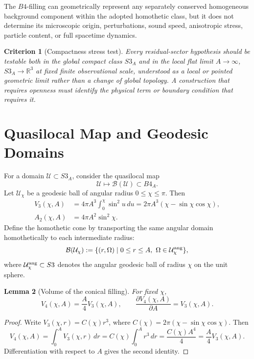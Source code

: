 \documentclass[11pt,a4paper]{article}
\def\Bfour{B4}%
\def\Sthree{S3}%
\def\dd{d}%
\numberwithin{equation}{section}
\newtheorem{criterion}{Criterion}
\newtheorem{lemma}[criterion]{Lemma}
\theoremstyle{remark}
\newcommand{\Sthree}{S^3}
\newcommand{\Bfour}{B^4}
\newcommand{\Dom}{\mathcal{U}}
\newcommand{\B}{\mathcal{B}}
\newcommand{\dd}{\mathrm{d}}
\begin{document}
The \(\Bfour\)-filling can geometrically represent any separately conserved homogeneous background component within the adopted homothetic class, but it does not determine its microscopic origin, perturbations, sound speed, anisotropic stress, particle content, or full spacetime dynamics.

\begin{criterion}[Compactness stress test]
Every residual-sector hypothesis should be testable both in the global compact class \(\Sthree_A\) and in the local flat limit \(A\to\infty\), \(\Sthree_A\to\mathbb{R}^3\) at fixed finite observational scale, understood as a local or pointed geometric limit rather than a change of global topology. A construction that requires openness must identify the physical term or boundary condition that requires it.
\end{criterion}

\section{Quasilocal Map and Geodesic Domains}
For a domain \(\Dom\subset \Sthree_A\), consider the quasilocal map
\begin{equation}
\Dom\longmapsto \B(\Dom)\subset \Bfour_A.
\end{equation}
Let \(\Dom_\chi\) be a geodesic ball of angular radius \(0\le \chi\le\pi\). Then
\begin{align}
V_3(\chi,A)&=4\pi A^3\int_0^\chi \sin^2u\,\dd u
=2\pi A^3(\chi-\sin\chi\cos\chi),\\
A_2(\chi,A)&=4\pi A^2\sin^2\chi.
\end{align}
Define the homothetic cone by transporting the same angular domain homothetically to each intermediate radius:
\begin{equation}
\B(\Dom_\chi):=\{(r,\Omega)\mid 0\le r\le A,\ \Omega\in \Dom_\chi^{\rm ang}\},
\end{equation}
where \(\Dom_\chi^{\rm ang}\subset \Sthree\) denotes the angular geodesic ball of radius \(\chi\) on the unit sphere.

\begin{lemma}[Volume of the conical filling]
For fixed \(\chi\),
\begin{equation}
V_4(\chi,A)=\frac{A}{4}V_3(\chi,A),
\qquad
\frac{\partial V_4(\chi,A)}{\partial A}=V_3(\chi,A).
\end{equation}
\end{lemma}
\begin{proof}
Write \(V_3(\chi,r)=C(\chi)r^3\), where \(C(\chi)=2\pi(\chi-\sin\chi\cos\chi)\). Then
\begin{equation}
V_4(\chi,A)=\int_0^A V_3(\chi,r)\,\dd r
=C(\chi)\int_0^A r^3\,\dd r
=\frac{C(\chi)A^4}{4}
=\frac{A}{4}V_3(\chi,A).
\end{equation}
Differentiation with respect to \(A\) gives the second identity.
\end{proof}
\end{document}
